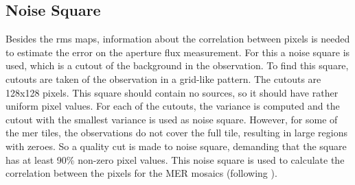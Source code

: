 

\subsection{Noise Square}

Besides the \gls{rms} maps, information about the correlation between pixels is needed to estimate the error on the aperture flux measurement. For this a noise square is used, which is a cutout of the background in the observation. To find this square, cutouts are taken of the observation in a grid-like pattern. The cutouts are 128x128 pixels. This square should contain no sources, so it should have rather uniform pixel values. For each of the cutouts, the variance is computed and the cutout with the smallest variance is used as noise square. However, for some of the \gls{mer} tiles, the observations do not cover the full tile, resulting in large regions with zeroes. So a quality cut is made to noise square, demanding that the square has at least 90\% non-zero pixel values. This noise square is used to calculate the correlation between the pixels for the MER mosaics (following ).






